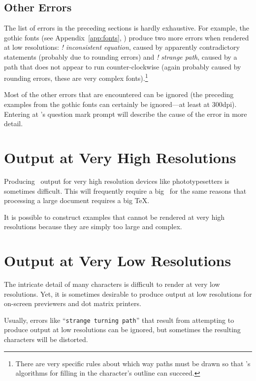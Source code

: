 \subsection{Other Errors}

The list of errors in the preceding sections is hardly exhaustive.  For
example, the gothic fonts (see Appendix~\ref{app:fonts},
\textit{}) produce two more errors when rendered at low
resolutions: \textit{! inconsistent equation}, caused by apparently
contradictory statements (probably due to rounding errors) and \textit{!
strange path}, caused by a path that does not appear to run
counter-clockwise (again probably caused by rounding errors, these are very
complex fonts).\footnote{There are very specific rules about which way paths
must be drawn so that \MF's algorithms for filling in the character's outline
can succeed.}  

Most of the other errors that are encountered can be ignored (the preceding
examples from the gothic fonts can certainly be ignored---at least at 300dpi).
Entering  at \MF's question mark prompt will describe the cause of the
error in more detail.

\section{Output at Very High Resolutions}

Producing \MF\ output for very high resolution
 devices like phototypesetters
is sometimes difficult.  This will frequently require a big \MF\ for
the same reasons that processing a large document requires a big \TeX.

It is possible to construct examples that cannot be rendered at very high
resolutions because they are simply too large and complex.

\section{Output at Very Low Resolutions}

The intricate 
detail of many characters is difficult to render at very 
low resolutions.  Yet, it is sometimes desirable to produce output at low
resolutions for on-screen previewers and dot matrix printers.

Usually, errors like ``\texttt{strange turning path}'' that result from attempting
to produce output at low resolutions can be ignored, but sometimes the
resulting characters will be distorted.
